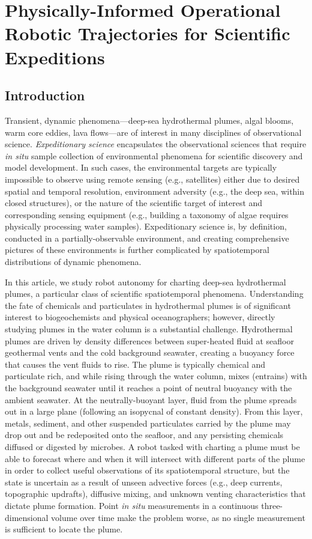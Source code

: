 \chapter{Physically-Informed Operational Robotic Trajectories for Scientific Expeditions}


\section{Introduction}
Transient, dynamic phenomena---deep-sea hydrothermal plumes, algal blooms, warm core eddies, lava flows---are of interest in many disciplines of observational science. \emph{Expeditionary science} encapsulates the observational sciences that require \emph{in situ} sample collection of environmental phenomena for scientific discovery and model development. In such cases, the environmental targets are typically impossible to observe using remote sensing (e.g., satellites) either due to desired spatial and temporal resolution, environment adversity (e.g., the deep sea, within closed structures), or the nature of the scientific target of interest and corresponding sensing equipment (e.g., building a taxonomy of algae requires physically processing water samples). Expeditionary science is, by definition, conducted in a partially-observable environment, and creating comprehensive pictures of these environments is further complicated by spatiotemporal distributions of dynamic phenomena. 

In this article, we study robot autonomy for charting deep-sea hydrothermal plumes, a particular class of scientific spatiotemporal phenomena. Understanding the fate of chemicals and particulates in hydrothermal plumes is of significant interest to biogeochemists and physical oceanographers; however, directly studying plumes in the water column is a substantial challenge. Hydrothermal plumes are driven by density differences between super-heated fluid at seafloor geothermal vents and the cold background seawater, creating a buoyancy force that causes the vent fluids to rise. The plume is typically chemical and particulate rich, and while rising through the water column, mixes (entrains) with the background seawater until it reaches a point of neutral buoyancy with the ambient seawater. At the neutrally-buoyant layer, fluid from the plume spreads out in a large plane (following an isopycnal of constant density). From this layer, metals, sediment, and other suspended particulates carried by the plume may drop out and be redeposited onto the seafloor, and any persisting chemicals diffused or digested by microbes. A robot tasked with charting a plume must be able to forecast where and when it will intersect with different parts of the plume in order to collect useful observations of its spatiotemporal structure, but the state is uncertain as a result of unseen advective forces (e.g., deep currents, topographic updrafts), diffusive mixing, and unknown venting characteristics that dictate plume formation. Point \emph{in situ} measurements in a continuous three-dimensional volume over time make the problem worse, as no single measurement is sufficient to locate the plume. 

